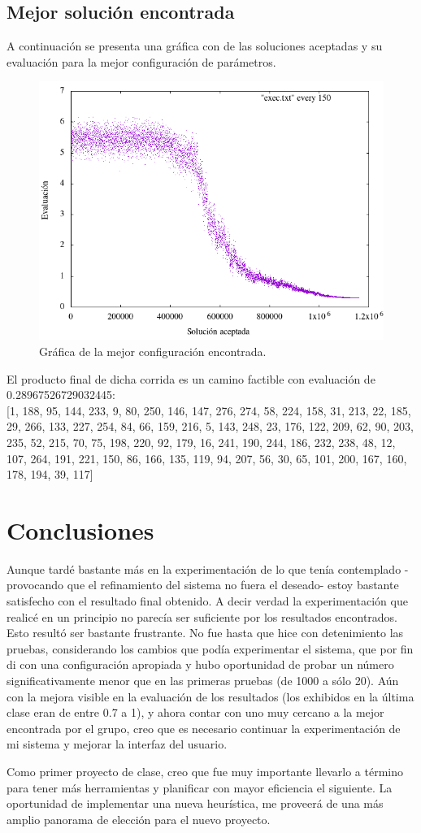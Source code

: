 \documentclass[12pt]{article}
\begin{document}
\subsection*{Mejor solución encontrada}
A continuación se presenta una gráfica con de las soluciones aceptadas
y su evaluación para la mejor configuración de parámetros.
\begin{figure}[H]
  \centering
  \includegraphics[width=1\textwidth]{mejor}
  \caption{Gráfica de la mejor configuración encontrada.}
\end{figure}

El producto final de dicha corrida es un camino factible con evaluación
de 0.28967526729032445:\\

[1, 188, 95, 144, 233, 9, 80, 250, 146, 147, 276, 274, 58, 224, 158, 31, 213, 22, 185, 29, 266, 133, 227, 254, 84, 66, 159, 216, 5, 143, 248, 23, 176, 122, 209, 62, 90, 203, 235, 52, 215, 70, 75, 198, 220, 92, 179, 16, 241, 190, 244, 186, 232, 238, 48, 12, 107, 264, 191, 221, 150, 86, 166, 135, 119, 94, 207, 56, 30, 65, 101, 200, 167, 160, 178, 194, 39, 117]

\section{Conclusiones}
Aunque tardé bastante más en la experimentación de lo que tenía contemplado -provocando que el refinamiento del sistema no fuera el deseado-
estoy bastante satisfecho con el resultado final obtenido. A decir verdad la experimentación que realicé en un principio no parecía ser suficiente por los resultados encontrados. Esto resultó ser bastante frustrante. No fue hasta que hice con detenimiento las pruebas, considerando los cambios que podía experimentar el sistema, que por fin di con una configuración apropiada y hubo oportunidad
de probar un número significativamente menor que en las primeras pruebas (de 1000 a sólo 20). Aún con la mejora visible en la evaluación de los
resultados (los exhibidos en la última clase eran de entre 0.7 a 1), y ahora contar con uno muy cercano a la mejor encontrada por el grupo, creo que es necesario continuar la experimentación de mi sistema y mejorar la interfaz del usuario. 

Como primer proyecto de clase, creo que fue muy importante llevarlo a
término para tener más herramientas y planificar con mayor eficiencia
el siguiente. La oportunidad de implementar una nueva heurística,
me proveerá de una más amplio panorama de elección para el nuevo proyecto. 
\end{document}
